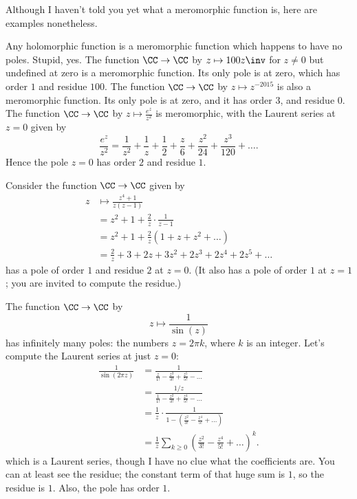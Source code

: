 Although I haven't told you yet what a meromorphic function is,
here are examples nonetheless.
\begin{example}
	\listhack
	\begin{enumerate}[(a)]
		\ii Any holomorphic function is a meromorphic function which happens to have no poles.
		Stupid, yes.
		\ii The function $\CC \to \CC$ by $z \mapsto 100z\inv$ for $z \neq 0$
		but undefined at zero is a meromorphic function.
		Its only pole is at zero, which has order $1$ and residue $100$.
		\ii The function $\CC \to \CC$ by $z \mapsto z^{-2015}$ is also a meromorphic function.
		Its only pole is at zero, and it has order $3$, and residue $0$.
		\ii The function $\CC \to \CC$ by $z \mapsto \frac{e^z}{z^2}$ is meromorphic,
		with the Laurent series at $z=0$ given by
		\[
			\frac{e^z}{z^2}
			= \frac{1}{z^2} + \frac{1}{z} + \frac{1}{2} + \frac{z}{6} + \frac{z^2}{24} + \frac{z^3}{120}
			+ \dots.
		\]
		Hence the pole $z=0$ has order $2$ and residue $1$.
	\end{enumerate}
\end{example}
\begin{example}
	Consider the function $\CC \to \CC$ given  by
	\begin{align*}
		z &\mapsto \frac{z^4+1}{z(z-1)} \\
		&= z^2 + 1 + \frac 2z \cdot \frac{1}{z-1} \\
		&= z^2 + 1 + \frac 2z \left( 1 + z + z^2 + \dots  \right) \\
		&= \frac 2z + 3 + 2z + 3z^2 + 2z^3 + 2z^4 + 2z^5 + \dots 
	\end{align*}
	has a pole of order $1$ and residue $2$ at $z=0$.
	(It also has a pole of order $1$ at $z=1$; you are invited to compute the residue.)
\end{example}
\begin{example}
	The function $\CC \to \CC$ by \[ z \mapsto \frac{1}{\sin(z)} \]
	has infinitely many poles: the numbers $z = 2\pi k$, where $k$ is an integer.
	Let's compute the Laurent series at just $z=0$:
	\begin{align*}
		\frac{1}{\sin(2\pi z)}
		&= \frac{1}{\frac{z}{1!} - \frac{z^3}{3!} + \frac{z^5}{5!} - \dots} \\
		&= \frac{1/z}{\frac{1}{1!} - \frac{z^2}{3!} + \frac{z^4}{5!} - \dots} \\
		&= \frac 1z \cdot \frac{1}{1 - \left( \frac{z^2}{3!} - \frac{z^4}{5!} + \dots \right)} \\
		&= \frac 1z \sum_{k \ge 0} \left( \frac{z^2}{3!} - \frac{z^4}{5!} + \dots \right)^k.
	\end{align*}
	which is a Laurent series, though I have no clue what the coefficients are.
	You can at least see the residue; the constant term of that huge sum is $1$,
	so the residue is $1$.
	Also, the pole has order $1$.
\end{example}

